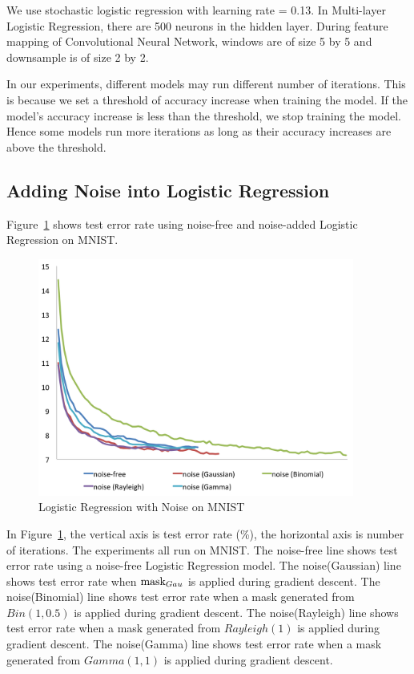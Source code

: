 We use stochastic logistic regression with learning rate = 0.13.
In Multi-layer Logistic Regression, there are 500 neurons in the hidden
layer. During feature mapping of Convolutional Neural Network, windows
are of size 5 by 5 and downsample is of size 2 by 2.

In our experiments, different models may run different number of
iterations. This is because we set a threshold of accuracy increase when
training the model. If the model's accuracy increase is less than the
threshold, we stop training the model. Hence some models run more
iterations as long as their accuracy increases are above the threshold.

\subsection{Adding Noise into Logistic Regression}
Figure~\ref{logistic} shows test error rate using noise-free and
noise-added Logistic Regression on MNIST.
\begin{figure}[!htbp]
\centering
\includegraphics[width=295pt]{f-figs/logistic.png}
\caption{Logistic Regression with Noise on MNIST}
\label{logistic}
\end{figure}

In Figure~\ref{logistic}, the vertical axis is test error rate (\%), the
horizontal axis is number of iterations. The experiments all run on MNIST.
The noise-free line shows test error rate using a noise-free Logistic
Regression model.
The noise(Gaussian) line shows test error rate when $\text{mask}_{Gau}$ is applied during gradient descent.
The noise(Binomial) line shows test error rate when a mask generated from
$Bin(1,0.5)$ is applied during gradient descent.
The noise(Rayleigh) line shows test error rate when a mask generated from
$Rayleigh(1)$ is applied during gradient descent.
The noise(Gamma) line shows test error rate when a mask generated from
$Gamma(1,1)$ is applied during gradient descent.

